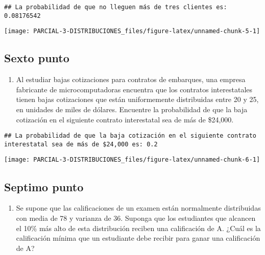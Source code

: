 \documentclass[
]{article}
\providecommand{\tightlist}{%
  \setlength{\itemsep}{0pt}\setlength{\parskip}{0pt}}
\begin{document}
\begin{verbatim}
## La probabilidad de que no lleguen más de tres clientes es: 0.08176542
\end{verbatim}

\begin{center}\texttt{[image: PARCIAL-3-DISTRIBUCIONES\_files/figure-latex/unnamed-chunk-5-1]} \end{center}

\subsection{Sexto punto}\label{sexto-punto}

\begin{enumerate}
\def\labelenumi{\arabic{enumi}.}
\setcounter{enumi}{5}
\tightlist
\item
  Al estudiar bajas cotizaciones para contratos de embarques, una
  empresa fabricante de microcomputadoras encuentra que los contratos
  interestatales tienen bajas cotizaciones que están uniformemente
  distribuidas entre 20 y 25, en unidades de miles de dólares. Encuentre
  la probabilidad de que la baja cotización en el siguiente contrato
  interestatal sea de más de \$24,000.
\end{enumerate}

\begin{verbatim}
## La probabilidad de que la baja cotización en el siguiente contrato interestatal sea de más de $24,000 es: 0.2
\end{verbatim}

\begin{center}\texttt{[image: PARCIAL-3-DISTRIBUCIONES\_files/figure-latex/unnamed-chunk-6-1]} \end{center}

\subsection{Septimo punto}\label{septimo-punto}

\begin{enumerate}
\def\labelenumi{\arabic{enumi}.}
\setcounter{enumi}{6}
\tightlist
\item
  Se supone que las calificaciones de un examen están normalmente
  distribuidas con media de 78 y varianza de 36. Suponga que los
  estudiantes que alcancen el 10\% más alto de esta distribución reciben
  una calificación de A. ¿Cuál es la calificación mínima que un
  estudiante debe recibir para ganar una calificación de A?
\end{enumerate}
\end{document}
